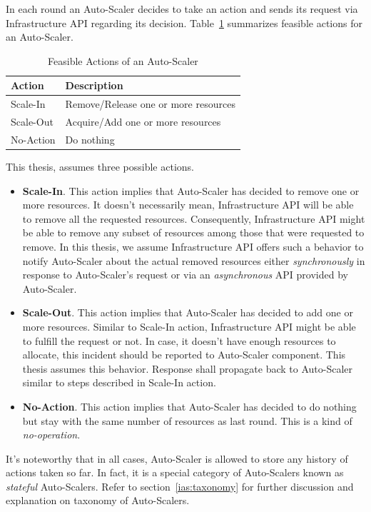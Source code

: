 In each round an Auto-Scaler decides to take an action and sends its request via Infrastructure API regarding its decision. Table~\ref{tab:actions-sum} summarizes feasible actions for an Auto-Scaler.
\begin{table}[h!]
    \begin{tabular}{ll}
        \toprule
        \textbf{Action} & \textbf{Description}\\
        \midrule
        Scale-In & Remove/Release one or more resources\\
        Scale-Out & Acquire/Add one or more resources\\
        No-Action & Do nothing\\
        \bottomrule
    \end{tabular}
    \centering
    \caption{Feasible Actions of an Auto-Scaler}
    \label{tab:actions-sum}
\end{table}
This thesis, assumes three possible actions.
\begin{itemize}
    \item \textbf{Scale-In}. This action implies that Auto-Scaler has decided to remove one or more resources. It doesn't necessarily mean, Infrastructure API will be able to remove all the requested resources. Consequently, Infrastructure API might be able to remove any subset of resources among those that were requested to remove. In this thesis, we assume Infrastructure API offers such a behavior to notify Auto-Scaler about the actual removed resources either \emph{synchronously} in response to Auto-Scaler's request or via an \emph{asynchronous} API provided by Auto-Scaler.
    \item \textbf{Scale-Out}. This action implies that Auto-Scaler has decided to add one or more resources. Similar to Scale-In action, Infrastructure API might be able to fulfill the request or not. In case, it doesn't have enough resources to allocate, this incident should be reported to Auto-Scaler component. This thesis assumes this behavior. Response shall propagate back to Auto-Scaler similar to steps described in Scale-In action.
    \item \textbf{No-Action}. This action implies that Auto-Scaler has decided to do nothing but stay with the same number of resources as last round. This is a kind of \emph{no-operation}.
\end{itemize}
It's noteworthy that in all cases, Auto-Scaler is allowed to store any history of actions taken so far. In fact, it is a special category of Auto-Scalers known as \emph{stateful} Auto-Scalers. Refer to section~\ref{ias:taxonomy} for further discussion and explanation on taxonomy of Auto-Scalers.


